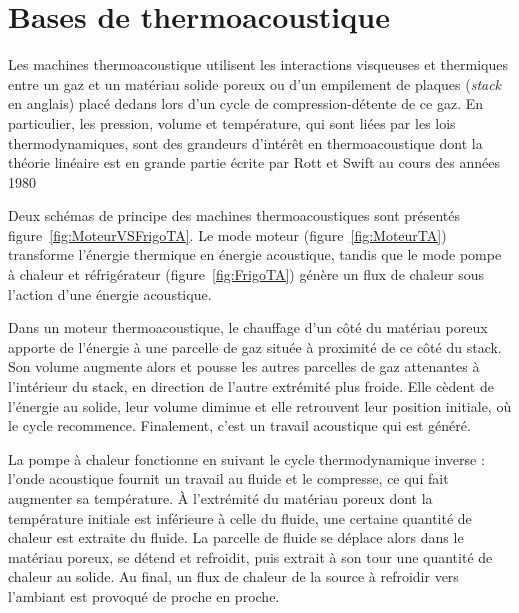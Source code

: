 \section{Bases de thermoacoustique}

Les machines thermoacoustique utilisent les interactions visqueuses et thermiques entre un gaz et un matériau solide poreux ou d’un empilement de plaques (\textit{stack} en anglais) placé dedans lors d’un cycle de compression-détente de ce gaz. En particulier, les pression, volume et température, qui sont liées par les lois thermodynamiques, sont des grandeurs d’intérêt en thermoacoustique dont la théorie linéaire est en grande partie écrite par Rott et Swift au cours des années 1980 \cite{rott_damped_1969, rott_thermally_1973, rott_thermally_1975, rott_thermally_1976, zouzoulas_thermally_1976, rott_thermoacoustics_1980, muller_thermally_1983}

Deux schémas de principe des machines thermoacoustiques sont présentés figure~\ref{fig:MoteurVSFrigoTA}. Le mode moteur (figure~\ref{fig:MoteurTA}) transforme l’énergie thermique en énergie acoustique, tandis que le mode pompe à chaleur et réfrigérateur (figure~\ref{fig:FrigoTA}) génère un flux de chaleur sous l'action d'une énergie acoustique. 

Dans un moteur thermoacoustique, le chauffage d'un côté du matériau poreux apporte de l'énergie à une parcelle de gaz située à proximité de ce côté du stack. Son volume augmente alors et pousse les autres parcelles de gaz attenantes à l'intérieur du stack, en direction de l'autre extrémité plus froide. Elle cèdent de l'énergie au solide, leur volume diminue et elle retrouvent leur position initiale, où le cycle recommence. Finalement, c'est un travail acoustique qui est généré.

La pompe à chaleur fonctionne en suivant le cycle thermodynamique inverse : l'onde acoustique fournit un travail au fluide et le compresse, ce qui fait augmenter sa température. À l'extrémité du matériau poreux dont la température initiale est inférieure à celle du fluide, une certaine quantité de chaleur est extraite du fluide. La parcelle de fluide se déplace alors dans le matériau poreux, se détend et refroidit, puis extrait à son tour une quantité de chaleur au solide. Au final, un flux de chaleur de la source à refroidir vers l'ambiant est provoqué de proche en proche.\smallskip


